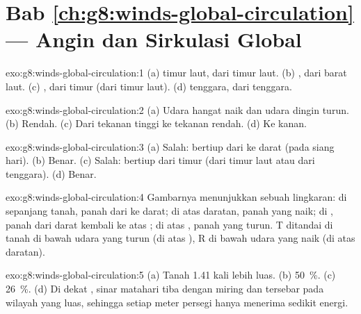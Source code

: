 \section*{Bab \ref{ch:g8:winds-global-circulation} --- Angin dan Sirkulasi Global}

\begin{solution}{exo:g8:winds-global-circulation:1}
(a)  timur laut, dari timur laut. (b) , dari barat
laut. (c) , dari timur (dari timur laut). (d)  tenggara, dari tenggara.
\end{solution}

\begin{solution}{exo:g8:winds-global-circulation:2}
(a) Udara hangat naik dan udara dingin turun. (b) Rendah. (c) Dari tekanan
tinggi ke tekanan rendah. (d) Ke kanan.
\end{solution}

\begin{solution}{exo:g8:winds-global-circulation:3}
(a) Salah:  bertiup dari  ke darat (pada siang hari).
(b) Benar. (c) Salah:  bertiup dari timur (dari timur laut atau
dari tenggara). (d) Benar.
\end{solution}

\begin{solution}{exo:g8:winds-global-circulation:4}
Gambarnya menunjukkan sebuah lingkaran: di sepanjang tanah, panah dari 
ke darat; di atas daratan, panah yang naik; di , panah dari darat
kembali ke atas ; di atas , panah yang turun. T ditandai di tanah
di bawah udara yang turun (di atas ), R di bawah udara yang naik (di
atas daratan).
\end{solution}

\begin{solution}{exo:g8:winds-global-circulation:5}
(a) Tanah 1.41 kali lebih luas. (b) 50~\%. (c) 26~\%. (d) Di dekat ,
sinar matahari tiba dengan miring dan tersebar pada wilayah yang luas,
sehingga setiap meter persegi hanya menerima sedikit energi.
\end{solution}

